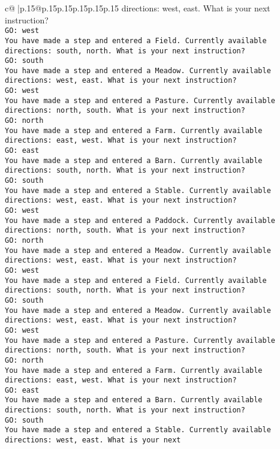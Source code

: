 \documentclass{article}
\begin{document}
{\begin{supertabular}{c@{$\;$}|p{.15\linewidth}@{}p{.15\linewidth}p{.15\linewidth}p{.15\linewidth}p{.15\linewidth}p{.15\linewidth}}
{{{directions: west, east. What is your next instruction?\\ \tt GO: west\\ \tt You have made a step and entered a Field. Currently available directions: south, north. What is your next instruction?\\ \tt GO: south\\ \tt You have made a step and entered a Meadow. Currently available directions: west, east. What is your next instruction?\\ \tt GO: west\\ \tt You have made a step and entered a Pasture. Currently available directions: north, south. What is your next instruction?\\ \tt GO: north\\ \tt You have made a step and entered a Farm. Currently available directions: east, west. What is your next instruction?\\ \tt GO: east\\ \tt You have made a step and entered a Barn. Currently available directions: south, north. What is your next instruction?\\ \tt GO: south\\ \tt You have made a step and entered a Stable. Currently available directions: west, east. What is your next instruction?\\ \tt GO: west\\ \tt You have made a step and entered a Paddock. Currently available directions: north, south. What is your next instruction?\\ \tt GO: north\\ \tt You have made a step and entered a Meadow. Currently available directions: west, east. What is your next instruction?\\ \tt GO: west\\ \tt You have made a step and entered a Field. Currently available directions: south, north. What is your next instruction?\\ \tt GO: south\\ \tt You have made a step and entered a Meadow. Currently available directions: west, east. What is your next instruction?\\ \tt GO: west\\ \tt You have made a step and entered a Pasture. Currently available directions: north, south. What is your next instruction?\\ \tt GO: north\\ \tt You have made a step and entered a Farm. Currently available directions: east, west. What is your next instruction?\\ \tt GO: east\\ \tt You have made a step and entered a Barn. Currently available directions: south, north. What is your next instruction?\\ \tt GO: south\\ \tt You have made a step and entered a Stable. Currently available directions: west, east. What is your next }}}
\end{supertabular}}
\end{document}
